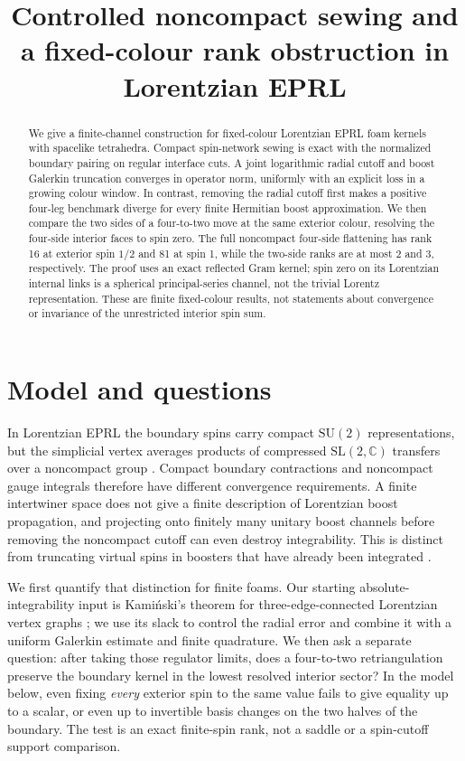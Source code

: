 \documentclass[11pt]{article}
\title{Controlled noncompact sewing and a fixed-colour rank obstruction in Lorentzian EPRL}
\author{}
\date{}
\theoremstyle{remark}
\newcommand{\CC}{\mathbb C}
\begin{document}
\maketitle

\begin{abstract}
We give a finite-channel construction for fixed-colour Lorentzian EPRL foam kernels with spacelike tetrahedra. Compact spin-network sewing is exact with the normalized boundary pairing on regular interface cuts. A joint logarithmic radial cutoff and boost Galerkin truncation converges in operator norm, uniformly with an explicit loss in a growing colour window. In contrast, removing the radial cutoff first makes a positive four-leg benchmark diverge for every finite Hermitian boost approximation. We then compare the two sides of a four-to-two move at the same exterior colour, resolving the four-side interior faces to spin zero. The full noncompact four-side flattening has rank 16 at exterior spin \(1/2\) and 81 at spin 1, while the two-side ranks are at most 2 and 3, respectively. The proof uses an exact reflected Gram kernel; spin zero on its Lorentzian internal links is a spherical principal-series channel, not the trivial Lorentz representation. These are finite fixed-colour results, not statements about convergence or invariance of the unrestricted interior spin sum.
\end{abstract}

\section{Model and questions}

In Lorentzian EPRL the boundary spins carry compact \(\mathrm{SU}(2)\) representations, but the simplicial vertex averages products of compressed \(\mathrm{SL}(2,\CC)\) transfers over a noncompact group \cite{EPRL,EP,Barrett}. Compact boundary contractions and noncompact gauge integrals therefore have different convergence requirements. A finite intertwiner space does not give a finite description of Lorentzian boost propagation, and projecting onto finitely many unitary boost channels before removing the noncompact cutoff can even destroy integrability. This is distinct from truncating virtual spins in boosters that have already been integrated \cite{Speziale}.

We first quantify that distinction for finite foams. Our starting absolute-integrability input is Kami\'nski's theorem for three-edge-connected Lorentzian vertex graphs \cite{Kaminski}; we use its slack to control the radial error and combine it with a uniform Galerkin estimate and finite quadrature. We then ask a separate question: after taking those regulator limits, does a four-to-two retriangulation preserve the boundary kernel in the lowest resolved interior sector? In the model below, even fixing \emph{every} exterior spin to the same value fails to give equality up to a scalar, or even up to invertible basis changes on the two halves of the boundary. The test is an exact finite-spin rank, not a saddle or a spin-cutoff support comparison.
\end{document}

